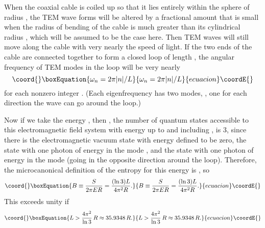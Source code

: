\documentclass[a4paper,12pt]{article}
\begin{document}
	When the coaxial cable is coiled up
so that it lies entirely within the sphere of radius \coordHE{},
the TEM wave forms will be altered
by a fractional amount that is small
when the radius of bending of the cable is much greater
than its cylindrical radius \coordHE{}, which will be
assumed to be the case here.  Then TEM waves will
still move along the cable with very nearly the
speed of light.  If the two ends of the cable are connected
together to form a closed loop of length \coordHE{},
the angular frequency of TEM modes in the loop
will be very nearly
 \begin{equation}\coord{}\boxEquation{
 \omega_n = 2\pi |n|/L
 \label{eq:15}
 }{
 \omega_n = 2\pi |n|/L
 }{ecuacion}\coordE{}\end{equation}
for each nonzero integer \coordHE{}.
(Each eigenfrequency has two modes, \coordHE{}, one for each
direction the wave can go around the loop.)

	Now if we take the energy
\coordHE{},
then \coordHE{}, the number of quantum states
accessible to this electromagnetic field system
with energy up to and including \coordHE{},
is 3, since there is the electromagnetic vacuum
state with energy defined to be zero,
the state with one photon of energy \coordHE{}
in the mode \coordHE{},
and the state with one photon of energy \coordHE{}
in the mode \coordHE{}
(going in the opposite direction around the loop).
Therefore, the microcanonical definition
of the entropy for this energy is
\coordHE{}, so
 \begin{equation}\coord{}\boxEquation{
 B \equiv {S \over 2 \pi E R} = {(\ln{3}) L \over 4 \pi^2 R}.
 \label{eq:16}
 }{
 B \equiv {S \over 2 \pi E R} = {(\ln{3}) L \over 4 \pi^2 R}.
 }{ecuacion}\coordE{}\end{equation}
This exceeds unity if 
 \begin{equation}\coord{}\boxEquation{
 L > {4 \pi^2 \over \ln{3}} \, R \approx 35.9348 \, R.
 \label{eq:17}
 }{
 L > {4 \pi^2 \over \ln{3}} \, R \approx 35.9348 \, R.
 }{ecuacion}\coordE{}\end{equation}
\end{document}
